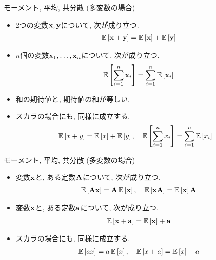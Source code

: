 \documentclass[dvipdfmx,notheorems,t]{beamer}
\begin{document}
\begin{frame}{モーメント, 平均, 共分散 (多変数の場合)}
\begin{itemize}
  \item 2つの変数$\vb{x}, \vb{y}$について, 次が成り立つ.
  \begin{align*}
    \E{\vb{x} + \vb{y}} = \E{\vb{x}} + \E{\vb{y}}
  \end{align*}
  \item $n$個の変数$\vb{x}_1, \ldots, \vb{x}_n$について, 次が成り立つ.
  \begin{align*}
    \E{\sum_{i = 1}^n \vb{x}_i} = \sum_{i = 1}^n \E{\vb{x}_i}
  \end{align*}
  \item 和の期待値と, 期待値の和が等しい.
  \item スカラの場合にも, 同様に成立する.
  \begin{align*}
    \E{x + y} &= \E{x} + \E{y}, \quad
    \E{\sum_{i = 1}^n x_i} = \sum_{i = 1}^n \E{x_i}
  \end{align*}
\end{itemize}
\end{frame}

\begin{frame}{モーメント, 平均, 共分散 (多変数の場合)}
\begin{itemize}
  \item 変数$\vb{x}$と, ある定数$\vb{A}$について, 次が成り立つ.
  \begin{align*}
    \E{\vb{A} \vb{x}} = \vb{A} \E{\vb{x}}, \quad
    \E{\vb{x} \vb{A}} = \E{\vb{x}} \vb{A}
  \end{align*}
  \item 変数$\vb{x}$と, ある定数$\vb{a}$について, 次が成り立つ.
  \begin{align*}
    \E{\vb{x} + \vb{a}} = \E{\vb{x}} + \vb{a}
  \end{align*}
  \item スカラの場合にも, 同様に成立する.
  \begin{align*}
    \E{a x} = a \E{x}, \quad
    \E{x + a} = \E{x} + a
  \end{align*}
\end{itemize}
\end{frame}
\end{document}
